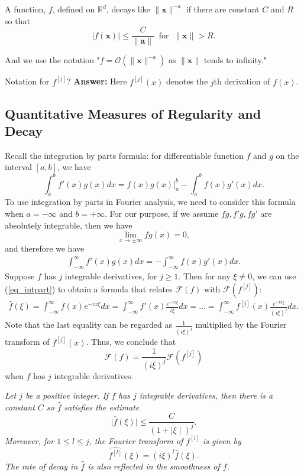 \begin{Definition}[Definition 4.2.3.]
    A function, $f$, defined on $\mathbb R^d$, decays like $\lVert\mathbf{x}\rVert^{-a}$ if there are constant $C$ and $R$ so that 
    \[\mid f(\mathbf{x})\mid \leq \frac{C}{\lVert \mathbf a\rVert } ~\text{ for }~ \lVert \mathbf x\rVert > R.\]
\end{Definition}
And we use the notation "$f=\mathcal O(\lVert \mathbf x\rVert^{-a})$ as $\lVert\mathbf x\rVert$ tends to infinity."

\begin{Question}
    Notation for $f^{[j]}$? \textbf{Answer:} Here $f^{[j]}(x)$ denotes the $j$th derivation of $f(x)$. %
\end{Question}

\subsection{Quantitative Measures of Regularity and Decay}
Recall the integration by parts formula: for differentiable function $f$ and $g$ on the interval $[a,b]$, we have 
\[
\int_a^b f'(x) g(x) d x = f(x) g(x)\bigg\rvert_a^b - \int_a^b f(x) g'(x) d x.
\]
To use integration by parts in Fourier analysis, we need to consider this formula when $a = -\infty$ and $b = + \infty$. 
For our purpose, if we assume $fg, f'g, fg'$ are absolutely integrable, then we have 
\[
\lim_{x \rightarrow \pm \infty} fg(x) = 0,
\]
and therefore we have
\begin{align}\label{eq_intpart}
    \int_{-\infty}^{\infty} f'(x) g(x) d x = - \int_{-\infty}^{\infty} f(x) g'(x) d x.
\end{align}
Suppose $f$ has $j$ integrable derivatives, for $j \geq 1$.
Then for any $\xi \neq 0$, we can use (\ref{eq_intpart}) to obtain a formula that relates $\mathcal{F}(f)$ with $\mathcal{F}(f^{[j]})$:
\begin{align*}
    \hat{f}(\xi) = \int_{-\infty}^{\infty} f(x) e^{-i x\xi}d x 
    = \int_{-\infty}^{\infty} f'(x) \frac{e^{-i x\xi}}{i \xi}d x 
    = \ldots 
    = \int_{-\infty}^{\infty} f^{[j]}(x) \frac{e^{-i x\xi}}{(i \xi)^j}d x. 
\end{align*}
Note that the last equality can be regarded as $\frac{1}{(i \xi)^j}$ multiplied by the Fourier transform of $f^{[j]}(x)$. 
Thus, we conclude that
\[
\mathcal{F}(f) = \frac{1}{(i \xi)^j} \mathcal{F}(f^{[j]})
\]
when $f$ has $j$ integrable derivatives. 

\begin{Proposition}[Proposition 4.2.1.]
\textit{Let $j$ be a positive integer. If $f$ has $j$ integrable derivatives, then there is a constant $C$ so $\hat{f}$ satisfies the estimate \[\vert \hat{f}(\xi)\vert \leq \frac{C}{(1+\mid \xi\mid)^j}.\] Moreover, for $1\leq l\leq j$, the Fourier transform of $f^{[l]}$ is given by \[\widehat{f^{[l]}}(\xi)=(i\xi)^l \hat{f}(\xi).\] The rate of decay in $\hat{f}$ is also reflected in the smoothness of $f$.}
\end{Proposition}

